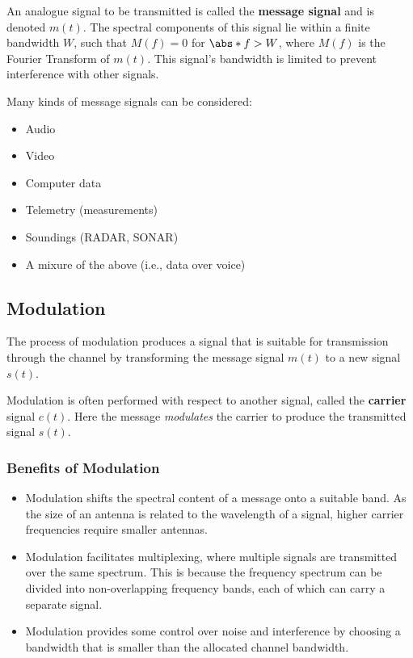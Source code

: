 \documentclass{article}
\begin{document}
An analogue signal to be transmitted is called the \textbf{message
signal} and is denoted \(m\left( t \right)\). The spectral components
of this signal lie within a finite bandwidth \(W\), such that \(M\left(
f \right) = 0\) for \(\abs*{f} > W\), where \(M\left( f \right)\) is
the Fourier Transform of \(m\left( t \right)\). This signal's bandwidth
is limited to prevent interference with other signals.

Many kinds of message signals can be considered:
\begin{itemize}
    \item Audio
    \item Video
    \item Computer data
    \item Telemetry (measurements)
    \item Soundings (RADAR, SONAR)
    \item A mixure of the above (i.e., data over voice)
\end{itemize}
\subsection{Modulation}
The process of modulation produces a signal that is suitable for
transmission through the channel by transforming the message signal
\(m\left( t \right)\) to a new signal \(s\left( t \right)\).

Modulation is often performed with respect to another signal, called
the \textbf{carrier} signal \(c\left( t \right)\). Here the message
\textit{modulates} the carrier to produce the transmitted signal
\(s\left( t \right)\).
\subsubsection{Benefits of Modulation}
\begin{itemize}
    \item Modulation shifts the spectral content of a message onto a
          suitable band. As the size of an antenna is related to the
          wavelength of a signal, higher carrier frequencies require
          smaller antennas.
    \item Modulation facilitates multiplexing, where multiple signals
          are transmitted over the same spectrum. This is because the
          frequency spectrum can be divided into non-overlapping
          frequency bands, each of which can carry a separate signal.
    \item Modulation provides some control over noise and interference
          by choosing a bandwidth that is smaller than the allocated
          channel bandwidth.
\end{itemize}
\end{document}
